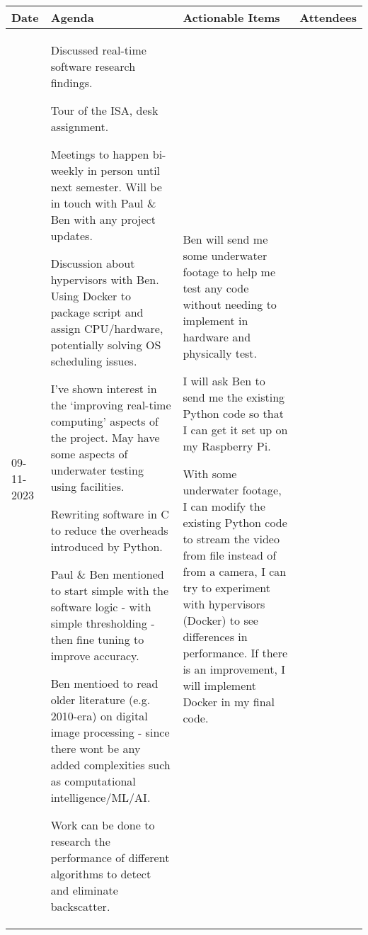 \begin{table}[!h]
    \centering
    \begin{tabularx}{\textwidth}{|l|X|X|X|}
        \hline
        Date & Agenda & Actionable Items & Attendees \\
        \hline
        \hline
        09-11-2023 & 
        \begin{myitemize}
            \item Discussed real-time software research findings.
            \item Tour of the ISA, desk assignment.
            \item Meetings to happen bi-weekly in person until next semester. Will be in touch with Paul \& Ben with any project updates.
            \item Discussion about hypervisors with Ben. Using Docker to package script and assign CPU/hardware, potentially solving OS scheduling issues.
            \item I've shown interest in the `improving real-time computing' aspects of the project. May have some aspects of underwater testing using facilities.
            \item Rewriting software in C to reduce the overheads introduced by Python.
            \item Paul \& Ben mentioned to start simple with the software logic - with simple thresholding - then fine tuning to improve accuracy.
            \item Ben mentioed to read older literature (e.g. 2010-era) on digital image processing - since there wont be any added complexities such as computational intelligence/ML/AI.
            \item Work can be done to research the performance of different algorithms to detect and eliminate backscatter.
        \end{myitemize} & 
        \begin{myitemize}
            \item Ben will send me some underwater footage to help me test any code without needing to implement in hardware and physically test.
            \item I will ask Ben to send me the existing Python code so that I can get it set up on my Raspberry Pi.
            \item With some underwater footage, I can modify the existing Python code to stream the video from file instead of from a camera, I can try to experiment with hypervisors (Docker) to see differences in performance. If there is an improvement, I will implement Docker in my final code.

\end{myitemize}
\end{tabularx}
\end{table}
